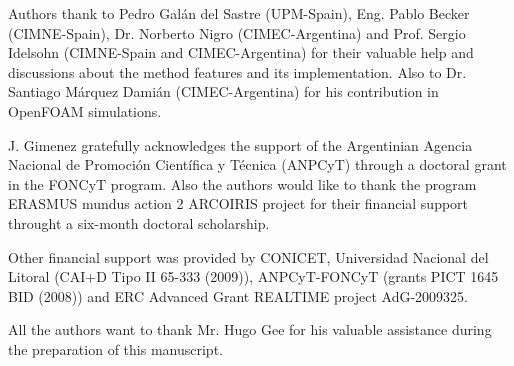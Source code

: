 \documentclass[review]{elsarticle}
\begin{document}
Authors thank to Pedro Gal\'an del Sastre (UPM-Spain), Eng. Pablo Becker (CIMNE-Spain), Dr. Norberto Nigro (CIMEC-Argentina) and Prof. Sergio Idelsohn (CIMNE-Spain and CIMEC-Argentina) for their valuable help and discussions about the method features and its implementation. Also to Dr. Santiago M\'arquez Dami\'an (CIMEC-Argentina) for his contribution in OpenFOAM simulations.

J. Gimenez gratefully acknowledges the support of the Argentinian Agencia Nacional de Promoci\'on Cient\'ifica y T\' ecnica (ANPCyT) through a doctoral grant in the FONCyT program. Also the authors would like to thank the program ERASMUS mundus action 2 ARCOIRIS project for their financial support throught a six-month doctoral scholarship.

Other financial support was provided by CONICET, Universidad Nacional del Litoral (CAI+D Tipo II 65-333 (2009)), ANPCyT-FONCyT (grants PICT 1645 BID (2008)) and ERC Advanced Grant REALTIME project AdG-2009325.

All the authors want to thank Mr. Hugo Gee for his valuable assistance during the preparation of this manuscript.



\end{document}
